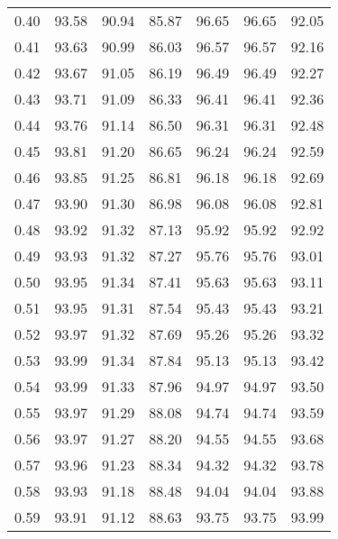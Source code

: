 \begin{tabular}{|c|c|c|c|c|c|c|}
      0.40 &     93.58 &     90.94 &      85.87 &   96.65 &      96.65 &         92.05 \\
      0.41 &     93.63 &     90.99 &      86.03 &   96.57 &      96.57 &         92.16 \\
      0.42 &     93.67 &     91.05 &      86.19 &   96.49 &      96.49 &         92.27 \\
      0.43 &     93.71 &     91.09 &      86.33 &   96.41 &      96.41 &         92.36 \\
      0.44 &     93.76 &     91.14 &      86.50 &   96.31 &      96.31 &         92.48 \\
      0.45 &     93.81 &     91.20 &      86.65 &   96.24 &      96.24 &         92.59 \\
      0.46 &     93.85 &     91.25 &      86.81 &   96.18 &      96.18 &         92.69 \\
      0.47 &     93.90 &     91.30 &      86.98 &   96.08 &      96.08 &         92.81 \\
      0.48 &     93.92 &     91.32 &      87.13 &   95.92 &      95.92 &         92.92 \\
      0.49 &     93.93 &     91.32 &      87.27 &   95.76 &      95.76 &         93.01 \\
      0.50 &     93.95 &     91.34 &      87.41 &   95.63 &      95.63 &         93.11 \\
      0.51 &     93.95 &     91.31 &      87.54 &   95.43 &      95.43 &         93.21 \\
      0.52 &     93.97 &     91.32 &      87.69 &   95.26 &      95.26 &         93.32 \\
      0.53 &     93.99 &     91.34 &      87.84 &   95.13 &      95.13 &         93.42 \\
      0.54 &     93.99 &     91.33 &      87.96 &   94.97 &      94.97 &         93.50 \\
      0.55 &     93.97 &     91.29 &      88.08 &   94.74 &      94.74 &         93.59 \\
      0.56 &     93.97 &     91.27 &      88.20 &   94.55 &      94.55 &         93.68 \\
      0.57 &     93.96 &     91.23 &      88.34 &   94.32 &      94.32 &         93.78 \\
      0.58 &     93.93 &     91.18 &      88.48 &   94.04 &      94.04 &         93.88 \\
      0.59 &     93.91 &     91.12 &      88.63 &   93.75 &      93.75 &         93.99 \\

\end{tabular}

